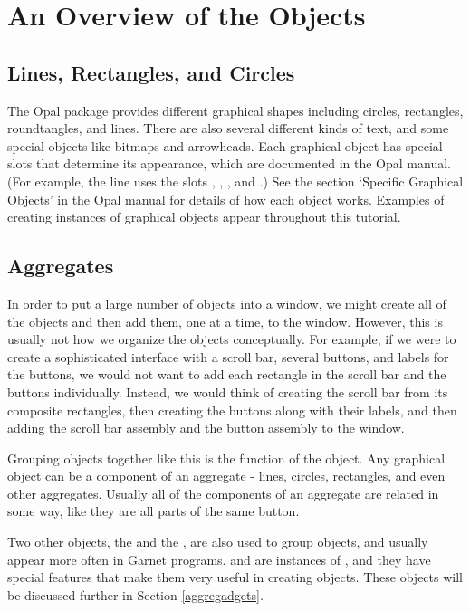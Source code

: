 \chapter{An Overview of the Objects}

\section{Lines, Rectangles, and Circles}

The Opal package provides different graphical shapes
including circles, rectangles, roundtangles, and lines.  There are
also several different kinds of text, and some special objects like
bitmaps and arrowheads.  Each graphical object has special slots that
determine its appearance, which are documented in the Opal manual.
(For example, the line uses the slots , , ,
and .)
See the section  `Specific Graphical Objects' in the Opal manual for
details of how each object works.  Examples of creating instances of
graphical objects appear throughout this tutorial.


\section{Aggregates}
\label{aggregates}

In order to put a large number of objects into a window, we might
create all of the objects and then add them, one at a time, to the
window.  However, this is usually not how
we organize the objects conceptually.  For example, if we were to
create a sophisticated interface with a scroll bar, several buttons,
and labels for the buttons, we would not want to add each rectangle in
the scroll bar and the buttons individually.  Instead, we would think
of creating the scroll bar from its composite rectangles, then
creating the buttons along with their labels, and then adding the
scroll bar assembly and the button assembly to the window.

Grouping objects together like this is the function of the 
object.  Any graphical object can be a component of an aggregate - lines,
circles, rectangles, and even other aggregates.  Usually all of the
components of an aggregate are related in some way, like they are all
parts of the same button.

Two other objects, the  and the
, are also used to group objects, and usually appear more
often in Garnet programs.   and  are
instances of , and they have special features that make
them very useful in creating objects.  These objects will be discussed
further in Section \ref{aggregadgets}.

